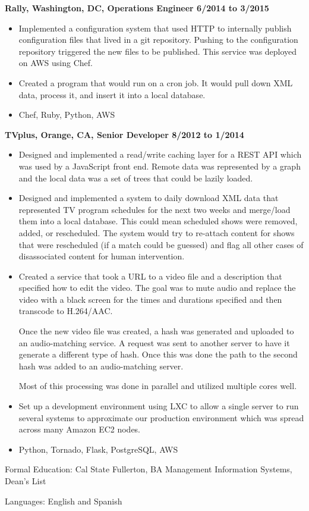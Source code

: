 \documentclass{res}
\begin{document}
\begin{resume}
  {\large \bf Rally, Washington, DC, Operations Engineer \hfill 6/2014 to 3/2015}

  \begin{itemize}

  \item
    Implemented a configuration system that used HTTP to
    internally publish configuration files that lived in a git repository.
    Pushing to the configuration repository triggered the new files
    to be published.  This service was deployed on AWS using Chef.
  \item
    Created a program that would run on a cron job.  It would pull down
    XML data, process it, and insert it into a local database.
  \item
    Chef, Ruby, Python, AWS
  \end{itemize}

  {\large \bf TVplus, Orange, CA, Senior Developer \hfill 8/2012 to 1/2014}

  \begin{itemize}

  \item
    Designed and implemented a read/write caching layer for a
    REST API which was used by a JavaScript front end.
    Remote data was represented by a graph and the
    local data was a set of trees that could be lazily loaded. 

  \item
    Designed and implemented a system to daily download XML data
    that represented TV program schedules for the next two weeks and
    merge/load them into a local database.  This could mean scheduled
    shows were removed, added, or rescheduled.  The system would try
    to re-attach content for shows that were rescheduled (if a match
    could be guessed) and flag all other cases of disassociated content
    for human intervention.

  \item
    Created a service that took a URL to a video file and a description
    that specified how to edit the video.  The goal was to mute audio
    and replace the video with a black screen for the times and durations
    specified and then transcode to H.264/AAC.

    Once the new video file was created, a hash was generated and uploaded
    to an audio-matching service. A request was sent to another server
    to have it generate a different type of hash.  Once this was done
    the path to the second hash was added to an audio-matching server.

    Most of this processing was done in parallel and utilized multiple cores
    well.

  \item
    Set up a development environment using LXC to allow a single server to
    run several systems to approximate our production environment which
    was spread across many Amazon EC2 nodes.
  \item
    Python, Tornado, Flask, PostgreSQL, AWS
  \end{itemize}
Formal Education: Cal State Fullerton, BA Management Information
Systems, Dean's List

Languages: English and Spanish
\end{resume}
\end{document}
